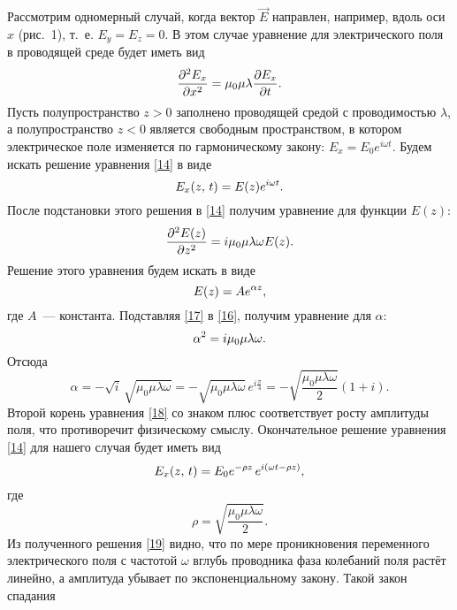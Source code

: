 




Рассмотрим одномерный случай, когда вектор $\vec{E}$ направлен, например, вдоль оси $x$ (рис.~1), т.~е. $E_y=E_z=0$. В этом
случае уравнение для электрического поля в проводящей среде будет иметь вид
\begin{equation} \eqmark{14}
\frac{\partial^2E_x}{\partial x^2}=\mu_0\mu\lambda\ddt{E_x}.
\end{equation}
Пусть полупространство $z>0$ заполнено проводящей средой с проводимостью $\lambda$, а полупространство $z<0$ является
свободным пространством, в котором электрическое поле изменяется по гармоническому закону: $E_x=E_0e^{i\omega t}$. Будем
искать решение уравнения \eqref{14} в виде
\begin{equation} \eqmark{15}
E_x(z,\,t)=E(z)e^{i\omega t}.
\end{equation}
После подстановки этого решения в \eqref{14} получим уравнение для функции $E(z)$:
\begin{equation} \eqmark{16}
\frac{\partial^2E(z)}{\partial z^2}=i\mu_0\mu\lambda\omega E(z).
\end{equation}
Решение этого уравнения будем искать в виде
\begin{equation} \eqmark{17}
E(z)=Ae^{\alpha z},
\end{equation}
где $A$~--- константа. Подставляя \eqref{17} в \eqref{16}, получим уравнение для $\alpha$:
\begin{equation} \eqmark{18}
\alpha^2=i\mu_0\mu\lambda\omega.
\end{equation}
Отсюда
\[
\alpha=-\sqrt{i}\,\sqrt{\mu_0\mu\lambda\omega}=-\sqrt{\mu_0\mu\lambda\omega}\,e^{i\frac{\pi}{4}}=-\sqrt{\frac{\mu_0\mu\lambda\omega}{2}}(1+i).
\]
Второй корень уравнения \eqref{18} со знаком плюс соответствует росту амплитуды поля, что противоречит физическому смыслу.
Окончательное решение уравнения \eqref{14} для нашего случая будет иметь вид
\begin{equation} \eqmark{19}
E_x(z,\,t)=E_0e^{-\rho z}\,e^{i(\omega t-\rho z)},
\end{equation}
где
\[
\rho=\sqrt{\frac{\mu_0\mu\lambda\omega}{2}}.
\]
Из полученного решения \eqref{19} видно, что по мере проникновения переменного электрического поля с частотой $\omega$ вглубь
проводника фаза колебаний поля растёт линейно, а амплитуда убывает по экспоненциальному закону. Такой закон спадания
